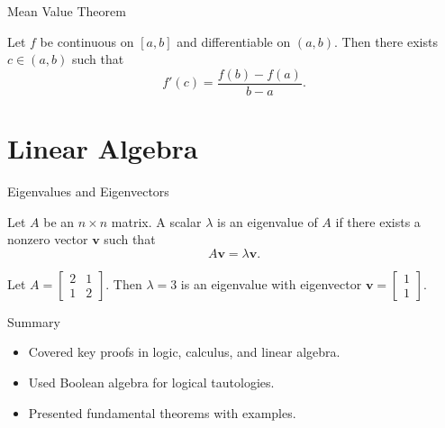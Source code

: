 \documentclass{beamer}
\begin{document}
\begin{frame}{Mean Value Theorem}
    \begin{theorem}
        Let $f$ be continuous on $[a,b]$ and differentiable on $(a,b)$. Then there exists $c \in (a,b)$ such that
        \[
        f'(c) = \frac{f(b) - f(a)}{b - a}.
        \]
    \end{theorem}
\end{frame}

\section{Linear Algebra}

\begin{frame}{Eigenvalues and Eigenvectors}
    \begin{definition}
        Let $A$ be an $n \times n$ matrix. A scalar $\lambda$ is an eigenvalue of $A$ if there exists a nonzero vector $\mathbf{v}$ such that
        \[
        A\mathbf{v} = \lambda \mathbf{v}.
        \]
    \end{definition}

    \begin{example}
        Let $A = \begin{bmatrix} 2 & 1 \\ 1 & 2 \end{bmatrix}$. Then $\lambda = 3$ is an eigenvalue with eigenvector $\mathbf{v} = \begin{bmatrix} 1 \\ 1 \end{bmatrix}$.
    \end{example}
\end{frame}

\begin{frame}{Summary}
    \begin{itemize}
        \item Covered key proofs in logic, calculus, and linear algebra.
        \item Used Boolean algebra for logical tautologies.
        \item Presented fundamental theorems with examples.
    \end{itemize}
\end{frame}
\end{document}
